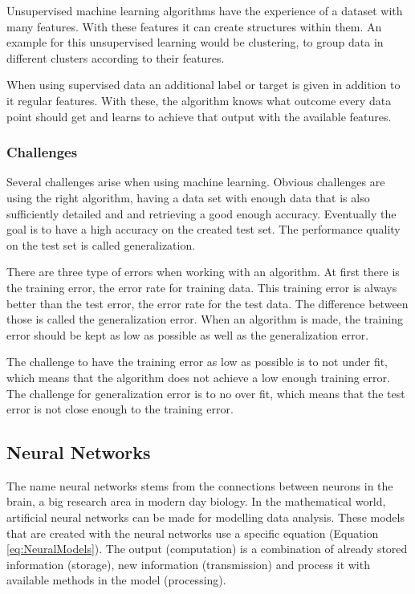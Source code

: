 \documentclass[10pt,a4paper]{report}
\begin{document}
	Unsupervised machine learning algorithms have the experience of a dataset 
	with many features. With these features it can create structures within 
	them. An example for this unsupervised learning would be clustering, to 
	group data in different clusters according to their 
	features.\cite{Goodfellow-et-al-2016}
	
	When using supervised data an additional label or target is given in 
	addition to it regular features. With these, the algorithm knows what 
	outcome every data point should get and learns to achieve that output with 
	the available features. \cite{Goodfellow-et-al-2016}
	
	\subsubsection{Challenges}
	
	Several challenges arise when using machine learning. Obvious challenges 
	are using the right algorithm, having a data set with enough data that is 
	also sufficiently detailed and and retrieving a good enough accuracy. 
	Eventually the goal is to have a high accuracy on the created test set. The 
	performance quality on the test set is called 
	generalization.\cite{Goodfellow-et-al-2016}
	
	
	There are three type of errors when working with an algorithm. At first 
	there is the training error, the error rate for training data. This 
	training error is always better than the test error, the error rate for the 
	test data. The difference between those is called the generalization error. 
	When an algorithm is made, the training error should be kept as low as 
	possible as well as the generalization error.\cite{Goodfellow-et-al-2016}
	
	
	The challenge to have the training error as low as possible is to not under 
	fit, which means that the algorithm does not achieve a low enough training 
	error. The challenge for generalization error is to no over fit, which 
	means that the test error is not close enough to the training 
	error.\cite{Goodfellow-et-al-2016}
	
	\clearpage
	
	\subsection{Neural Networks}
	
	The name neural networks stems from the connections between neurons in the 
	brain, a big research area in modern day biology. In the mathematical 
	world, artificial neural networks can be made for modelling data analysis. 
	These models that are created with the neural networks use a specific 
	equation (Equation \ref{eq:NeuralModels}). The output (computation) is a 
	combination of already stored information (storage), new information 
	(transmission) and process it with available methods in the model 
	(processing).\cite{rojas2013neural}
	
\end{document}
